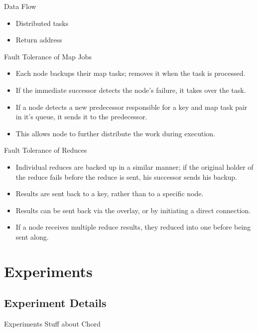 \documentclass[11pt]{beamer}
\begin{document}
\begin{frame}{Data Flow}
\begin{itemize}
	\item Distributed tasks
	\item Return address
\end{itemize}
 
\end{frame}


\begin{frame}{Fault Tolerance of Map Jobs}
\begin{itemize}
	\item Each node backups their map tasks; removes it when the task is processed.
	\item If the immediate successor detects the node's failure, it takes over the task.
	\item If a node detects a new predecessor responsible for a key and map task pair in it's queue, it sends it to the predecessor.
	\item This allows node to further distribute the work during execution.
\end{itemize}
\end{frame}



\begin{frame}{Fault Tolerance of Reduces}
\begin{itemize}
	\item Individual reduces are backed up in a similar manner; if the original holder of the reduce fails before the reduce is sent, his successor sends his backup.
	\item Results are sent back to a key, rather than to a specific node.
	\item Results can be sent back via the overlay, or by initiating a direct connection.
	\item If a node receives multiple reduce results, they reduced into one before being sent along.
\end{itemize}
\end{frame}



\section{Experiments}

\subsection{Experiment Details}
\begin{frame}{Experiments}
Stuff about Chord
\end{frame}
\end{document}
